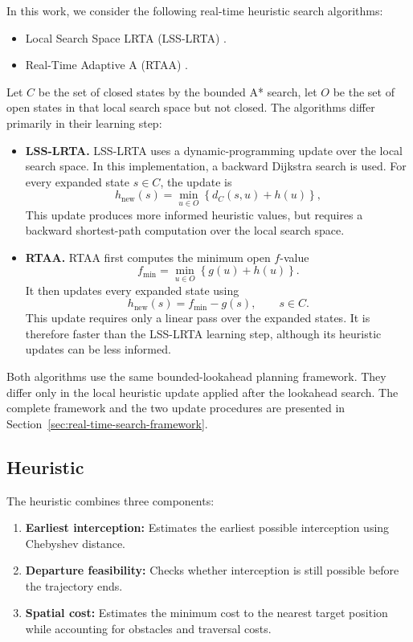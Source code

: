 \documentclass[11pt]{article}
\begin{document}
In this work, we consider the following real-time heuristic search algorithms:

\begin{itemize}
  \item Local Search Space LRTA (LSS-LRTA) \cite{koenig2009lsslrta}\cite{korf1990realtime}.
  \item Real-Time Adaptive A (RTAA) \cite{koenig2006rtaa}.
\end{itemize}

Let \(C\) be the set of closed states by the bounded A* search, let \(O\) be the set of open states in that local search space but not closed. The algorithms differ primarily in their learning step:

\begin{itemize}
  \item \textbf{LSS-LRTA.}
        LSS-LRTA uses a dynamic-programming update over the local search space. In this implementation, a backward Dijkstra search is used. For every expanded state \(s\in C\), the update is
        \[
          h_{\mathrm{new}}(s)
          =
          \min_{u\in O}
          \left\{
          d_C(s,u)+h(u)
          \right\},
        \]
        This update produces more informed heuristic values, but requires a backward shortest-path computation over the local search space.

  \item \textbf{RTAA.}
        RTAA first computes the minimum open \(f\)-value
        \[
          f_{\min}
          =
          \min_{u\in O}
          \left\{
          g(u)+h(u)
          \right\}.
        \]
        It then updates every expanded state using
        \[
          h_{\mathrm{new}}(s)=f_{\min}-g(s),
          \qquad s\in C.
        \]
        This update requires only a linear pass over the expanded states. It is therefore faster than the LSS-LRTA learning step, although its heuristic updates can be less informed.
\end{itemize}

Both algorithms use the same bounded-lookahead planning framework. They differ only
in the local heuristic update applied after the lookahead search. The complete
framework and the two update procedures are presented in
Section~\ref{sec:real-time-search-framework}.

\subsection{Heuristic}
The heuristic combines three components:
\begin{enumerate}
  \item \textbf{Earliest interception:} Estimates the earliest possible interception using Chebyshev distance.
  \item \textbf{Departure feasibility:} Checks whether interception is still possible before the trajectory ends.
  \item \textbf{Spatial cost:} Estimates the minimum cost to the nearest target position while accounting for obstacles and traversal costs.
\end{enumerate}
\end{document}
